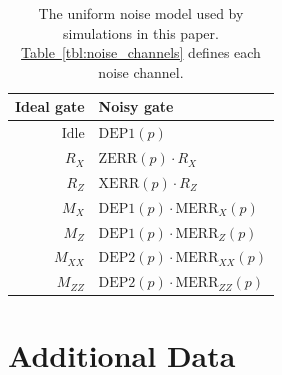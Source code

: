 \documentclass[onecolumn,unpublished,a4paper]{quantumarticle}
\theoremstyle{definition}
\theoremstyle{definition}
\theoremstyle{definition}
\newcommand{\tbl}[1]{\hyperref[tbl:#1]{Table~\ref*{tbl:#1}}}
\begin{document}
\begin{table}[H]
    \centering
    \begin{tabular}{|r|l|}
    \hline
    Ideal gate & Noisy gate
    \\
    \hline
    $\text{Idle}$ & $\text{DEP1}(p)$ \\
    \hline
    $R_X$ & $\text{ZERR}(p) \cdot R_X$
    \\
    $R_Z$ & $\text{XERR}(p) \cdot R_Z$
    \\
    \hline
    $M_X$ & $\text{DEP1}(p) \cdot \text{MERR}_X(p)$
    \\
    $M_Z$ & $\text{DEP1}(p) \cdot \text{MERR}_Z(p)$
    \\
    \hline
    $M_{XX}$ & $\text{DEP2}(p) \cdot \text{MERR}_{XX}(p)$
    \\
    $M_{ZZ}$ & $\text{DEP2}(p) \cdot \text{MERR}_{ZZ}(p)$
    \\
    \hline
    \end{tabular}
    \caption{
        The uniform noise model used by simulations in this paper.
        \tbl{noise_channels} defines each noise channel.
    }
    \label{tbl:noise_model}
\end{table}

\clearpage
\section{Additional Data}
\label{app:additional_data}
\end{document}
